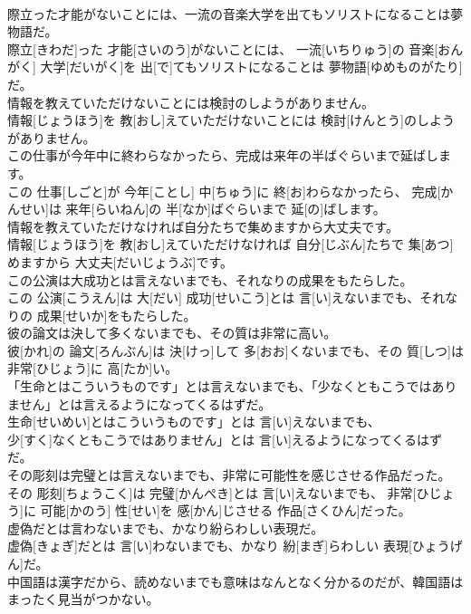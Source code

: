 \documentclass[8pt]{extreport}
\begin{document}
\begin{CJK}{UTF8}{min}
\\	際立った才能がないことには、一流の音楽大学を出てもソリストになることは夢物語だ。	
\\	際立[きわだ]った 才能[さいのう]がないことには、 一流[いちりゅう]の 音楽[おんがく] 大学[だいがく]を 出[で]てもソリストになることは 夢物語[ゆめものがたり]だ。
\\	情報を教えていただけないことには検討のしようがありません。	
\\	情報[じょうほう]を 教[おし]えていただけないことには 検討[けんとう]のしようがありません。
\\	この仕事が今年中に終わらなかったら、完成は来年の半ばぐらいまで延ばします。	
\\	この 仕事[しごと]が 今年[ことし] 中[ちゅう]に 終[お]わらなかったら、 完成[かんせい]は 来年[らいねん]の 半[なか]ばぐらいまで 延[の]ばします。
\\	情報を教えていただけなければ自分たちで集めますから大丈夫です。	
\\	情報[じょうほう]を 教[おし]えていただけなければ 自分[じぶん]たちで 集[あつ]めますから 大丈夫[だいじょうぶ]です。
\\	この公演は大成功とは言えないまでも、それなりの成果をもたらした。	
\\	この 公演[こうえん]は 大[だい] 成功[せいこう]とは 言[い]えないまでも、それなりの 成果[せいか]をもたらした。
\\	彼の論文は決して多くないまでも、その質は非常に高い。	
\\	彼[かれ]の 論文[ろんぶん]は 決[けっ]して 多[おお]くないまでも、その 質[しつ]は 非常[ひじょう]に 高[たか]い。
\\	「生命とはこういうものです」とは言えないまでも、「少なくともこうではありません」とは言えるようになってくるはずだ。	
\\	生命[せいめい]とはこういうものです」とは 言[い]えないまでも、
\\	少[すく]なくともこうではありません」とは 言[い]えるようになってくるはずだ。
\\	その彫刻は完璧とは言えないまでも、非常に可能性を感じさせる作品だった。	
\\	その 彫刻[ちょうこく]は 完璧[かんぺき]とは 言[い]えないまでも、 非常[ひじょう]に 可能[かのう] 性[せい]を 感[かん]じさせる 作品[さくひん]だった。
\\	虚偽だとは言わないまでも、かなり紛らわしい表現だ。	
\\	虚偽[きょぎ]だとは 言[い]わないまでも、かなり 紛[まぎ]らわしい 表現[ひょうげん]だ。
\\	中国語は漢字だから、読めないまでも意味はなんとなく分かるのだが、韓国語はまったく見当がつかない。	

\end{CJK}
\end{document}
